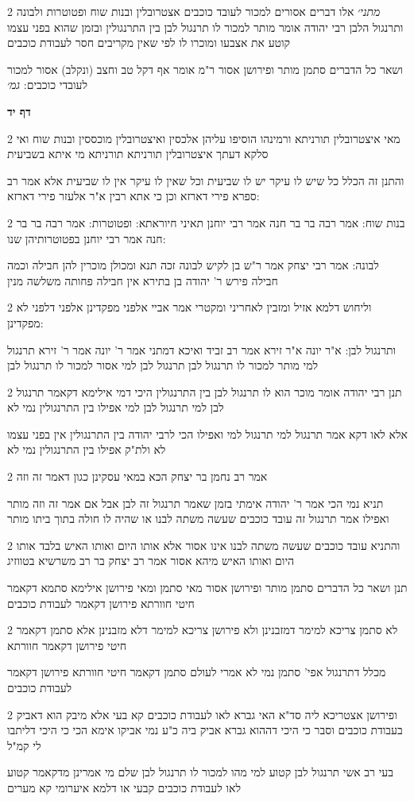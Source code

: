 \documentclass[12pt, openany]{book}
\newcommand{\sethebfont}{
\fontsize{10.5pt}{21.0pt} \selectfont
}
\newcommand{\twocol}[1]{
	{\sethebfont \begin{multicols}{2}
			#1
	\end{multicols}}	
}
\newcommand{\sectname}{}
\newcommand{\newsection}[1]{
	\addcontentsline{toc}{section}{#1}
	\renewcommand{\sectname}{#1}	
	\vspace{-\baselineskip}
	\begin{center}
		\textbf{%
\fontsize{16pt}{16pt}\selectfont
			#1}
	\end{center}
	\vspace{-\baselineskip}
	\nopagebreak
}
\begin{document}
\twocol{{\large\emph{מתני׳}} אלו דברים אסורים למכור לעובד כוכבים אצטרובלין ובנות שוח ופטוטרות ולבונה ותרנגול הלבן רבי יהודה אומר מותר למכור לו תרנגול לבן בין התרנגולין ובזמן שהוא בפני עצמו קוטע את אצבעו ומוכרו לו לפי שאין מקריבים חסר לעבודת כוכבים
\par ושאר כל הדברים סתמן מותר ופירושן אסור ר"מ אומר אף דקל טב וחצב (ונקלב) אסור למכור לעובדי כוכבים: {\large\emph{גמ׳}} }
\newsection{דף יד}
\twocol{מאי איצטרובלין תורניתא ורמינהו הוסיפו עליהן אלכסין ואיצטרובלין מוכססין ובנות שוח ואי סלקא דעתך איצטרובלין תורניתא תורניתא מי איתא בשביעית
\par והתנן זה הכלל כל שיש לו עיקר יש לו שביעית וכל שאין לו עיקר אין לו שביעית אלא אמר רב ספרא פירי דארזא וכן כי אתא רבין א"ר אלעזר פירי דארזא:}
\twocol{בנות שוח: אמר רבה בר בר חנה אמר רבי יוחנן תאיני חיוראתא: ופטוטרות: אמר רבה בר בר חנה אמר רבי יוחנן בפטוטרותיהן שנו:
\par לבונה: אמר רבי יצחק אמר ר"ש בן לקיש לבונה זכה תנא ומכולן מוכרין להן חבילה וכמה חבילה פירש ר' יהודה בן בתירא אין חבילה פחותה משלשה מנין}
\twocol{וליחוש דלמא אזיל ומזבין לאחריני ומקטרי אמר אביי אלפני מפקדינן אלפני דלפני לא מפקדינן:
\par ותרנגול לבן: א"ר יונה א"ר זירא אמר רב זביד ואיכא דמתני אמר ר' יונה אמר ר' זירא תרנגול למי מותר למכור לו תרנגול לבן תרנגול לבן למי אסור למכור לו תרנגול לבן}
\twocol{תנן רבי יהודה אומר מוכר הוא לו תרנגול לבן בין התרנגולין היכי דמי אילימא דקאמר תרנגול לבן למי תרנגול לבן למי אפילו בין התרנגולין נמי לא
\par אלא לאו דקא אמר תרנגול למי תרנגול למי ואפילו הכי לרבי יהודה בין התרנגולין אין בפני עצמו לא ולת"ק אפילו בין התרנגולין נמי לא}
\twocol{אמר רב נחמן בר יצחק הכא במאי עסקינן כגון דאמר זה וזה
\par תניא נמי הכי אמר ר' יהודה אימתי בזמן שאמר תרנגול זה לבן אבל אם אמר זה וזה מותר ואפילו אמר תרנגול זה עובד כוכבים שעשה משתה לבנו או שהיה לו חולה בתוך ביתו מותר}
\twocol{והתניא עובד כוכבים שעשה משתה לבנו אינו אסור אלא אותו היום ואותו האיש בלבד אותו היום ואותו האיש מיהא אסור אמר רב יצחק בר רב משרשיא בטווזיג
\par תנן ושאר כל הדברים סתמן מותר ופירושן אסור מאי סתמן ומאי פירושן אילימא סתמא דקאמר חיטי חוורתא פירושן דקאמר לעבודת כוכבים}
\twocol{לא סתמן צריכא למימר דמזבנינן ולא פירושן צריכא למימר דלא מזבנינן אלא סתמן דקאמר חיטי פירושן דקאמר חוורתא
\par מכלל דתרנגול אפי' סתמן נמי לא אמרי לעולם סתמן דקאמר חיטי חוורתא פירושן דקאמר לעבודת כוכבים}
\twocol{ופירושן אצטריכא ליה סד"א האי גברא לאו לעבודת כוכבים קא בעי אלא מיבק הוא דאביק בעבודת כוכבים וסבר כי היכי דההוא גברא אביק ביה כ"ע נמי אביקו אימא הכי כי היכי דליתבו לי קמ"ל
\par בעי רב אשי תרנגול לבן קטוע למי מהו למכור לו תרנגול לבן שלם מי אמרינן מדקאמר קטוע לאו לעבודת כוכבים קבעי או דלמא איערומי קא מערים}
\end{document}

